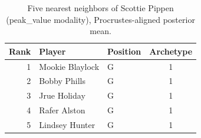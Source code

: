 \begin{table}[htbp]
  \centering\small
  \begin{tabular}{rllc}
    \toprule
    Rank & Player & Position & Archetype \\
    \midrule
    1 & Mookie Blaylock & G & 1 \\
    2 & Bobby Phills & G & 1 \\
    3 & Jrue Holiday & G & 1 \\
    4 & Rafer Alston & G & 1 \\
    5 & Lindsey Hunter & G & 1 \\
    \bottomrule
  \end{tabular}
  \caption{Five nearest neighbors of Scottie Pippen (peak_value modality), Procrustes-aligned posterior mean.}
  \label{tab:Scottie_Pippen_neighbors_peak_value}
\end{table}

